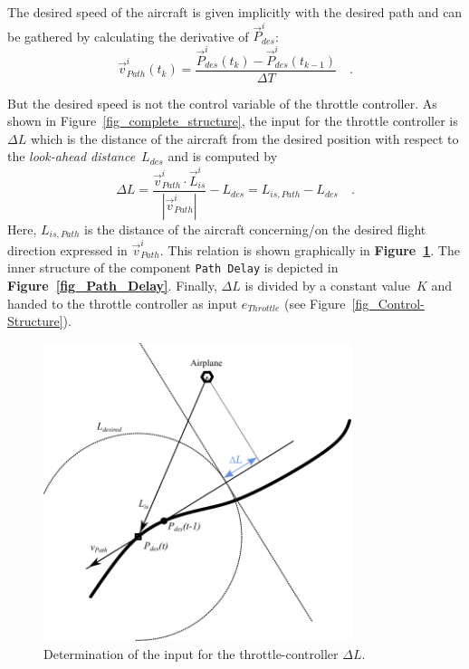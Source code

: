 \documentclass[11pt,a4paper]{scrartcl}		%
\begin{document}
The desired speed of the aircraft is given implicitly with the desired path and can be gathered by calculating the derivative of $\vec{P}_{des}^i$:
\begin{equation}
\vec{v}_{Path}^i(t_k) = \frac{\vec{P}_{des}^i(t_k)-\vec{P}_{des}^i(t_{k-1})}{\Delta T}\quad .
\end{equation}

But the desired speed is not the control variable of the throttle controller. As shown in Figure~\ref{fig_complete_structure}, the input for the throttle controller is $\Delta L$ which is the distance of the aircraft from the desired position with respect to the \textsl{look-ahead distance}~$L_{des}$ and is computed by
\begin{equation}
\Delta L = \frac{\vec{v}_{Path}^i \cdot \vec{L}_{is}^i}{|\vec{v}_{Path}^i|}-L_{des} = L_{is,Path}-L_{des} \quad .
\end{equation}
Here, $L_{is,Path}$ is the distance of the aircraft concerning/on the desired flight direction expressed in $\vec{v}_{Path}^i$.
This relation is shown graphically in \textbf{Figure~\ref{fig_explanation-diagram-throttle}}. The inner structure of the component \texttt{Path Delay} is depicted in \textbf{Figure~\ref{fig_Path_Delay}}.
Finally, $\Delta L$ is divided by a constant value~$K$ and handed to the throttle controller as input $e_{Throttle}$ (see Figure~\ref{fig_Control-Structure}).

\begin{figure}[bth]
  \begin{center}
  	\includegraphics[width=9cm]{pictures/explanation-diagram-throttle.pdf}
  \end{center}
  \caption{Determination of the input for the throttle-controller $\Delta L$.}
  \label{fig_explanation-diagram-throttle}
\end{figure}
\end{document}
